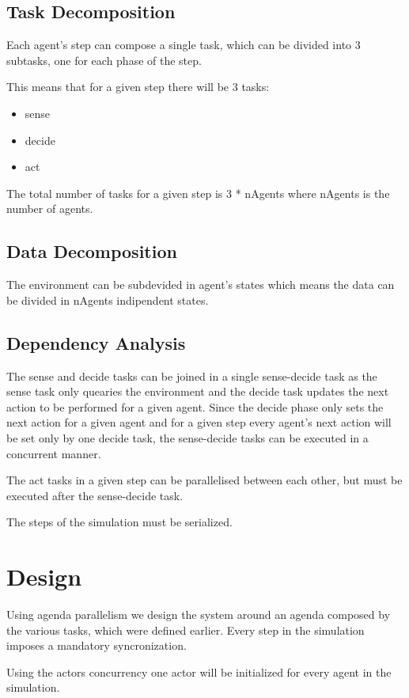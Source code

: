 \documentclass[12pt, a4paper]{report}
\begin{document}
\section{Task Decomposition}
Each agent's step can compose a single task, which can be divided into 3 subtasks,
 one for each phase of the step. 

This means that for a given step there will be 3 tasks:
\begin{itemize}
    \item sense
    \item decide
    \item act
\end{itemize}

The total number of tasks for a given step is 3 * nAgents
 where nAgents is the number of agents.

\section{Data Decomposition}
The environment can be subdevided in agent's states which
 means the data can be divided in nAgents indipendent states.

\section{Dependency Analysis}
The sense and decide tasks can be joined in a single
 sense-decide task as the sense task only quearies the
 environment and the decide task updates the next action
 to be performed for a given agent. Since the decide phase
 only sets the next action for a given agent and for a
 given step every agent's next action will be set only
 by one decide task, the sense-decide tasks can be executed
 in a concurrent manner.

The act tasks in a given step can be parallelised between each other, but
 must be executed after the sense-decide task.

The steps of the simulation must be serialized.

\chapter{Design}
Using agenda parallelism we design the system around an agenda
 composed by the various tasks, which were defined earlier. Every
 step in the simulation imposes a mandatory syncronization.

Using the actors concurrency one actor will be initialized for every agent in the simulation.
\end{document}
